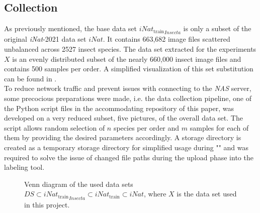 \subsection{Collection}\label{sub:collection}
As previously mentioned, the base data set ${iNat_{\text{train}}}_{Insecta}$ is only a subset of the original \textit{iNat}-2021 data set $iNat$.
It contains 663,682 image files scattered unbalanced across 2527 insect species.
The data set extracted for the experiments $X$ is an evenly distributed subset of the nearly 660,000 insect image files and contains 500 samples per order.
A simplified visualization of this set substitution can be found in .\\
To reduce network traffic and prevent issues with connecting to the \textit{NAS} server, some precocious preparations were made, i.e. the data collection pipeline, one of the Python script files in the accommodating repository of this paper, was developed on a very reduced subset, five pictures, of the overall data set.
The script allows random selection of $n$ species per order and $m$ samples for each of them by providing the desired parameters accordingly.
A storage directory is created as a temporary storage directory for simplified usage during ""
and was required to solve the issue of changed file paths during the upload phase into the labeling tool.

\begin{figure}[!ht]
    \centering


    \caption{Venn diagram of the used data sets $DS\subset {iNat_{\text{train}}}_{Insecta} \subset iNat_{\text{train}} \subset iNat$, where $X$ is the data set used in this project.}
    \label{fig:dataset-venn}
\end{figure}


